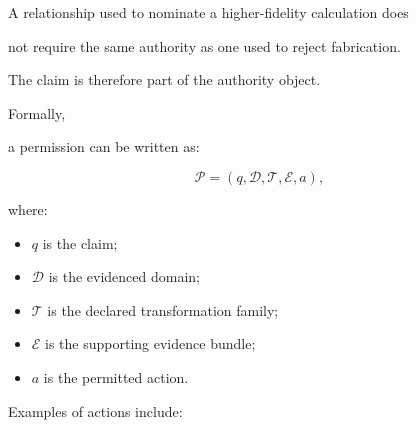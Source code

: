 \documentclass[11pt,a4paper,oneside]{report}
\begin{document}
A relationship used to nominate a higher-fidelity calculation does

not require the same authority as one used to reject fabrication.



The claim is therefore part of the authority object.



Formally,

a permission can be written as:



\begin{equation}
\label{eq:permission}
\mathcal{P}
=
\left(
q,
\mathcal{D},
\mathcal{T},
\mathcal{E},
a
\right),
\end{equation}



where:



\begin{itemize}



\item

$q$ is the claim;



\item

$\mathcal{D}$ is the evidenced domain;



\item

$\mathcal{T}$ is the declared transformation family;



\item

$\mathcal{E}$ is the supporting evidence bundle;



\item

$a$ is the permitted action.



\end{itemize}



Examples of actions include:
\end{document}

